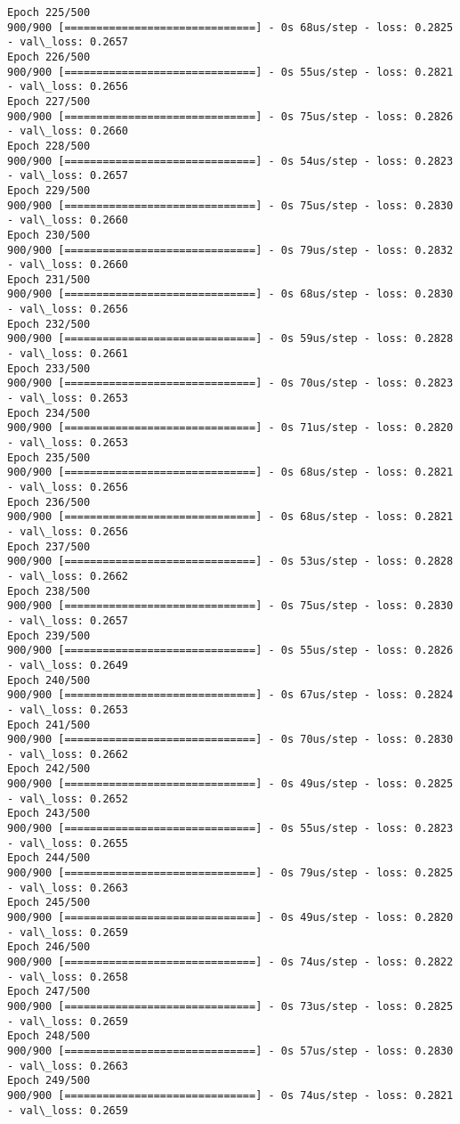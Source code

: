 \documentclass[11pt]{article}
\begin{document}
\begin{Verbatim}[commandchars=\\\{\}]
Epoch 225/500
900/900 [==============================] - 0s 68us/step - loss: 0.2825 - val\_loss: 0.2657
Epoch 226/500
900/900 [==============================] - 0s 55us/step - loss: 0.2821 - val\_loss: 0.2656
Epoch 227/500
900/900 [==============================] - 0s 75us/step - loss: 0.2826 - val\_loss: 0.2660
Epoch 228/500
900/900 [==============================] - 0s 54us/step - loss: 0.2823 - val\_loss: 0.2657
Epoch 229/500
900/900 [==============================] - 0s 75us/step - loss: 0.2830 - val\_loss: 0.2660
Epoch 230/500
900/900 [==============================] - 0s 79us/step - loss: 0.2832 - val\_loss: 0.2660
Epoch 231/500
900/900 [==============================] - 0s 68us/step - loss: 0.2830 - val\_loss: 0.2656
Epoch 232/500
900/900 [==============================] - 0s 59us/step - loss: 0.2828 - val\_loss: 0.2661
Epoch 233/500
900/900 [==============================] - 0s 70us/step - loss: 0.2823 - val\_loss: 0.2653
Epoch 234/500
900/900 [==============================] - 0s 71us/step - loss: 0.2820 - val\_loss: 0.2653
Epoch 235/500
900/900 [==============================] - 0s 68us/step - loss: 0.2821 - val\_loss: 0.2656
Epoch 236/500
900/900 [==============================] - 0s 68us/step - loss: 0.2821 - val\_loss: 0.2656
Epoch 237/500
900/900 [==============================] - 0s 53us/step - loss: 0.2828 - val\_loss: 0.2662
Epoch 238/500
900/900 [==============================] - 0s 75us/step - loss: 0.2830 - val\_loss: 0.2657
Epoch 239/500
900/900 [==============================] - 0s 55us/step - loss: 0.2826 - val\_loss: 0.2649
Epoch 240/500
900/900 [==============================] - 0s 67us/step - loss: 0.2824 - val\_loss: 0.2653
Epoch 241/500
900/900 [==============================] - 0s 70us/step - loss: 0.2830 - val\_loss: 0.2662
Epoch 242/500
900/900 [==============================] - 0s 49us/step - loss: 0.2825 - val\_loss: 0.2652
Epoch 243/500
900/900 [==============================] - 0s 55us/step - loss: 0.2823 - val\_loss: 0.2655
Epoch 244/500
900/900 [==============================] - 0s 79us/step - loss: 0.2825 - val\_loss: 0.2663
Epoch 245/500
900/900 [==============================] - 0s 49us/step - loss: 0.2820 - val\_loss: 0.2659
Epoch 246/500
900/900 [==============================] - 0s 74us/step - loss: 0.2822 - val\_loss: 0.2658
Epoch 247/500
900/900 [==============================] - 0s 73us/step - loss: 0.2825 - val\_loss: 0.2659
Epoch 248/500
900/900 [==============================] - 0s 57us/step - loss: 0.2830 - val\_loss: 0.2663
Epoch 249/500
900/900 [==============================] - 0s 74us/step - loss: 0.2821 - val\_loss: 0.2659

\end{Verbatim}
\end{document}
